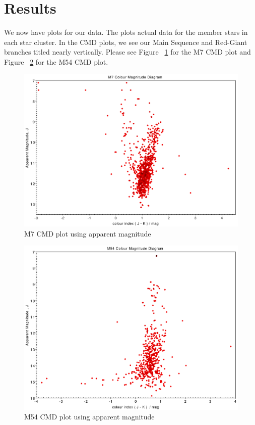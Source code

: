 \documentclass[12pt]{article}
\begin{document}
	\section{Results}
	We now have plots for our data. The plots actual data for the member stars in each star cluster. In the CMD plots, we see our Main Sequence and Red-Giant branches titled nearly vertically. Please see Figure ~\ref{fig: m7_cmd_apparent} for the M7 CMD plot and Figure ~\ref{fig: m54_cmd_apparent} for the M54 CMD plot.
		\begin{figure}[h!]
			\includegraphics[width=\textwidth]{m7_cmd_apparent}
			\caption{M7 CMD plot using apparent magnitude}
			\label{fig: m7_cmd_apparent}
		\end{figure}
		\begin{figure}[h!]
			\includegraphics[width=\textwidth]{m54_cmd_apparent}
			\caption{M54 CMD plot using apparent magnitude}
			\label{fig: m54_cmd_apparent}
		\end{figure}
\end{document}
